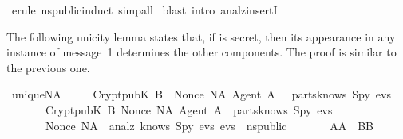 \begin{isabellebody}
\isamarkupfalse%
\ {}erule\ ns{}public{}induct{}\ simp{}all{}\isanewline
{}\isamarkupfalse%
\ {}blast\ intro{}\ analz{}insertI{}{}\isanewline
{}\isamarkupfalse%
%
\endisatagproof
{\isafoldproof}%
%
\isadelimproof
%
\endisadelimproof
%
\begin{isamarkuptext}%
The following unicity lemma states that, if  is secret, then its
appearance in any instance of message~1 determines the other components. 
The proof is similar to the previous one.%
\end{isamarkuptext}%
\isamarkuptrue%
\isamarkupfalse%
\ unique{}NA{}\isanewline
\ \ \ \ \ {}{}Crypt{}pubK\ B{}\ \ {}Nonce\ NA{}\ Agent\ A\ {}\ {}\ parts{}knows\ Spy\ evs{}{}\isanewline
\ \ \ \ \ \ \ Crypt{}pubK\ B{}{}\ {}Nonce\ NA{}\ Agent\ A{}{}\ {}\ parts{}knows\ Spy\ evs{}{}\isanewline
\ \ \ \ \ \ \ Nonce\ NA\ {}\ analz\ {}knows\ Spy\ evs{}{}\ evs\ {}\ ns{}public{}\isanewline
\ \ \ \ \ \ {}\ A{}A{}\ {}\ B{}B{}{}%

\end{isabellebody}
